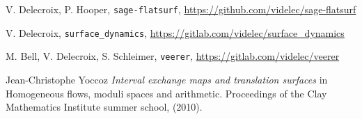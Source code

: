 \documentclass{article}
\begin{document}
%
%
%
%

\begin{thebibliography}{sage-flatsurf}

V. Delecroix, P. Hooper,
\texttt{sage-flatsurf},
\url{https://github.com/videlec/sage-flatsurf}

V. Delecroix,
\texttt{surface\_dynamics},
\url{https://gitlab.com/videlec/surface_dynamics}

M. Bell, V. Delecroix, S. Schleimer,
\texttt{veerer},
\url{https://gitlab.com/videlec/veerer}

Jean-Christophe Yoccoz
\textit{Interval exchange maps and translation surfaces}
in Homogeneous flows, moduli spaces and arithmetic.
Proceedings of the Clay Mathematics Institute summer school,
(2010).
\end{thebibliography}
\end{document}
